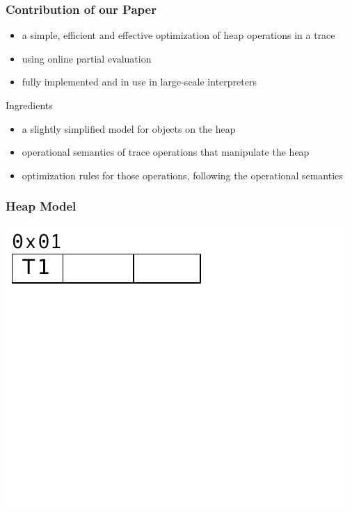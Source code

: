 \documentclass[utf8x]{beamer}
\begin{document}
\begin{frame}
  \frametitle{Contribution of our Paper}
  \begin{itemize}
      \item a simple, efficient and effective optimization of heap operations in a trace
      \item using online partial evaluation
      \item fully implemented and in use in large-scale interpreters
  \end{itemize}
  \pause
  \begin{block}{Ingredients}
      \begin{itemize}
          \item a slightly simplified model for objects on the heap
          \item operational semantics of trace operations that manipulate the heap
          \item optimization rules for those operations, following the operational semantics
      \end{itemize}
  \end{block}
\end{frame}



\begin{frame}
  \frametitle{Heap Model}
  \includegraphics[scale=0.9]{figures/heap01}
\end{frame}
\end{document}
